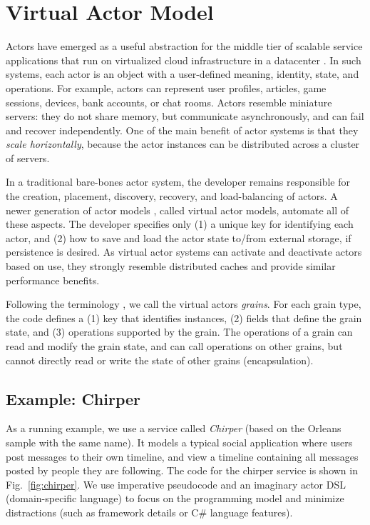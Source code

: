 \section{Virtual Actor Model}\label{sec:virtualactors}

Actors have emerged as a useful abstraction for the middle tier of scalable service applications that run on virtualized cloud infrastructure in a datacenter . In such systems, each actor is an object with a user-defined meaning, identity, state, and operations. For example, actors can represent user profiles, articles, game sessions, devices, bank accounts, or chat rooms. Actors resemble miniature servers: they do not share memory, but communicate asynchronously, and can fail and recover independently. One of the main benefit of actor systems is that they \emph{scale horizontally}, because the actor instances can be distributed across a cluster of servers.

In a traditional bare-bones actor system, the developer remains responsible for the creation, placement, discovery, recovery, and load-balancing of actors. A newer generation of actor models \cite{orleans,orbit,sfactors}, called virtual actor models, automate all of these aspects. The developer specifies only (1) a unique key for identifying each actor, and (2) how to save and load the actor state to/from external storage, if persistence is desired. As virtual actor systems can activate and deactivate actors based on use, they strongly resemble distributed caches \cite{memcached} and provide similar performance benefits. 

Following the terminology \cite{orleanstr,orleans-socc}, we call the virtual actors \emph{grains}. For each grain type, the code defines a (1) key that identifies instances, (2)  fields that define the grain state, and (3) operations supported by the grain. The operations of a grain can read and modify the grain state, and can call operations on other grains, but cannot directly read or write the state of other grains (encapsulation). 
 
\subsection{Example: Chirper}

As a running example, we use a service called \emph{Chirper} (based on the Orleans sample with the same name). It models a typical social application where users post messages to their own timeline, and view a timeline containing all messages posted by people they are following.
The code for the chirper service is shown in Fig.~\ref{fig:chirper}. We use imperative pseudocode and an imaginary actor DSL (domain-specific language) to focus on the programming model and minimize distractions (such as framework details or C\# language features). 

